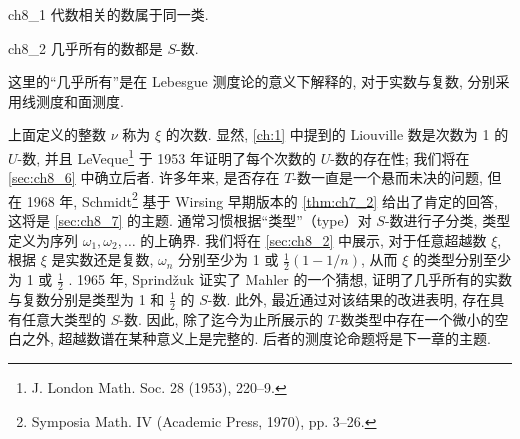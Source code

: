 \begin{mythm}{}{ch8_1}
代数相关的数属于同一类.
\end{mythm}

\begin{mythm}{}{ch8_2}
几乎所有的数都是 $S$-数.
\end{mythm}

这里的“几乎所有”是在 Lebesgue 测度论的意义下解释的, 对于实数与复数, 分别采用线测度和面测度.

上面定义的整数 $\nu$ 称为 $\xi$ 的次数. 显然, \autoref{ch:1} 中提到的 Liouville 数是次数为 1 的 $U$-数, 并且 LeVeque\footnote{J. London Math. Soc. 28 (1953), 220--9.} 于 1953 年证明了每个次数的 $U$-数的存在性; 我们将在 \autoref{sec:ch8_6} 中确立后者. 许多年来, 是否存在 $T$-数一直是一个悬而未决的问题, 但在 1968 年, Schmidt\footnote{Symposia Math. IV (Academic Press, 1970), pp. 3--26.} 基于 Wirsing 早期版本的 \autoref{thm:ch7_2} 给出了肯定的回答, 这将是 \autoref{sec:ch8_7} 的主题. 通常习惯根据“类型”（type）对 $S$-数进行子分类, 类型定义为序列 $\omega_1, \omega_2, \ldots$ 的上确界. 我们将在 \autoref{sec:ch8_2} 中展示, 对于任意超越数 $\xi$, 根据 $\xi$ 是实数还是复数, $\omega_n$ 分别至少为 1 或 $\frac{1}{2}(1-1/n)$, 从而 $\xi$ 的类型分别至少为 1 或 $\frac{1}{2}$ . 1965 年, Sprindžuk 证实了 Mahler 的一个猜想, 证明了几乎所有的实数与复数分别是类型为 1 和 $\frac{1}{2}$ 的 $S$-数. 此外, 最近通过对该结果的改进表明, 存在具有任意大类型的 $S$-数. 因此, 除了迄今为止所展示的 $T$-数类型中存在一个微小的空白之外, 超越数谱在某种意义上是完整的. 后者的测度论命题将是下一章的主题.

